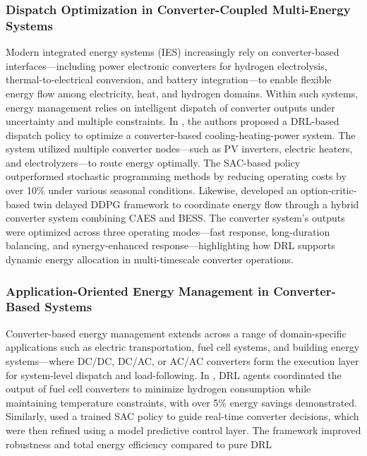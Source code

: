 \subsubsection{Dispatch Optimization in Converter-Coupled Multi-Energy Systems}

Modern integrated energy systems (IES) increasingly rely on converter-based interfaces—including power electronic converters for hydrogen electrolysis, thermal-to-electrical conversion, and battery integration—to enable flexible energy flow among electricity, heat, and hydrogen domains. Within such systems, energy management relies on intelligent dispatch of converter outputs under uncertainty and multiple constraints. In \cite{wang2025energy}, the authors proposed a DRL-based dispatch policy to optimize a converter-based cooling-heating-power system. The system utilized multiple converter nodes—such as PV inverters, electric heaters, and electrolyzers—to route energy optimally. The SAC-based policy outperformed stochastic programming methods by reducing operating costs by over 10\% under various seasonal conditions. Likewise, \cite{cui2024integrated} developed an option-critic-based twin delayed DDPG framework to coordinate energy flow through a hybrid converter system combining CAES and BESS. The converter system's outputs were optimized across three operating modes—fast response, long-duration balancing, and synergy-enhanced response—highlighting how DRL supports dynamic energy allocation in multi-timescale converter operations.

\subsubsection{Application-Oriented Energy Management in Converter-Based Systems}
  
Converter-based energy management extends across a range of domain-specific applications such as electric transportation, fuel cell systems, and building energy systems—where DC/DC, DC/AC, or AC/AC converters form the execution layer for system-level dispatch and load-following. In \cite{jiang2025collaborative}, DRL agents coordinated the output of fuel cell converters to minimize hydrogen consumption while maintaining temperature constraints, with over 5\% energy savings demonstrated. Similarly, \cite{quan2024customized} used a trained SAC policy to guide real-time converter decisions, which were then refined using a model predictive control layer. The framework improved robustness and total energy efficiency compared to pure DRL 

